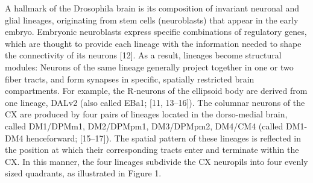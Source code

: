 \documentclass{article}
\begin{document}
 A hallmark of the Drosophila brain is its composition of invariant neuronal and glial lineages, originating from stem cells (neuroblasts) that appear in the early embryo. Embryonic neuroblasts express specific combinations of regulatory genes, which are thought to provide each lineage with the information needed to shape the connectivity of its neurons [12]. As a result, lineages become structural modules: Neurons of the same lineage generally project together in one or two fiber tracts, and form synapses in specific, spatially restricted brain compartments. For example, the R-neurons of the ellipsoid body are derived from one lineage, DALv2 (also called EBa1; [11, 13–16]). The columnar neurons of the CX are produced by four pairs of lineages located in the dorso-medial brain, called DM1/DPMm1, DM2/DPMpm1, DM3/DPMpm2, DM4/CM4 (called DM1-DM4 henceforward; [15–17]). The spatial pattern of these lineages is reflected in the position at which their corresponding tracts enter and terminate within the CX. In this manner, the four lineages subdivide the CX neuropils into four evenly sized quadrants, as illustrated in Figure 1.
\end{document}
